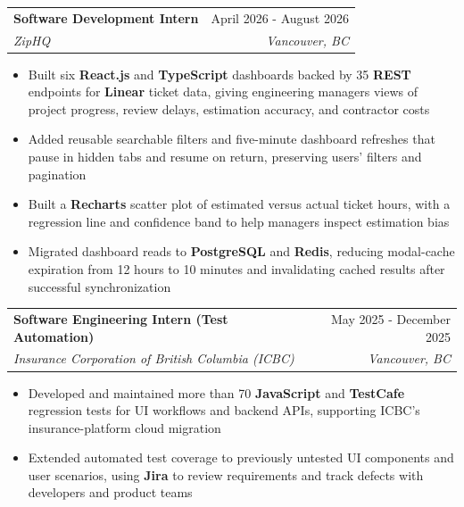 \documentclass[letterpaper,11pt]{article}
\makeatletter
\newcommand{\resumeItem}[1]{
  \item\small{
    {#1 \vspace{-2pt}}
  }
}
\newcommand{\resumeSubheading}[4]{
  \vspace{-2pt}\item
    \begin{tabular*}{0.97\textwidth}[t]{l@{\extracolsep{\fill}}r}
      \textbf{#1} & #2 \\
      \textit{\small#3} & \textit{\small #4} \\
    \end{tabular*}\vspace{-7pt}
}
\newcommand{\resumeSubSubheading}[2]{
    \item
    \begin{tabular*}{0.97\textwidth}{l@{\extracolsep{\fill}}r}
      \textit{\small#1} & \textit{\small #2} \\
    \end{tabular*}\vspace{-7pt}
}
\newcommand{\resumeSubHeadingListEnd}{\end{itemize}}
\newcommand{\resumeItemListStart}{\begin{itemize}}
\newcommand{\resumeItemListEnd}{\end{itemize}\vspace{-5pt}}
\makeatother
\begin{document}
\resumeSubheading
  {Software Development Intern}{April 2026 - August 2026}
  {ZipHQ}{Vancouver, BC}
  \resumeItemListStart

    \resumeItem{Built six \textbf{React.js} and \textbf{TypeScript} dashboards backed by 35 \textbf{REST} endpoints for \textbf{Linear} ticket data, giving engineering managers views of project progress, review delays, estimation accuracy, and contractor costs}

    \resumeItem{Added reusable searchable filters and five-minute dashboard refreshes that pause in hidden tabs and resume on return, preserving users' filters and pagination}

    \resumeItem{Built a \textbf{Recharts} scatter plot of estimated versus actual ticket hours, with a regression line and confidence band to help managers inspect estimation bias}

    \resumeItem{Migrated dashboard reads to \textbf{PostgreSQL} and \textbf{Redis}, reducing modal-cache expiration from 12 hours to 10 minutes and invalidating cached results after successful synchronization}

  \resumeItemListEnd

\resumeSubheading
  {Software Engineering Intern (Test Automation)}{May 2025 - December 2025}
  {Insurance Corporation of British Columbia (ICBC)}{Vancouver, BC}
  \resumeItemListStart

    \resumeItem{Developed and maintained more than 70 \textbf{JavaScript} and \textbf{TestCafe} regression tests for UI workflows and backend APIs, supporting ICBC's insurance-platform cloud migration}

    \resumeItem{Extended automated test coverage to previously untested UI components and user scenarios, using \textbf{Jira} to review requirements and track defects with developers and product teams}



  \resumeItemListEnd
      
\end{document}
